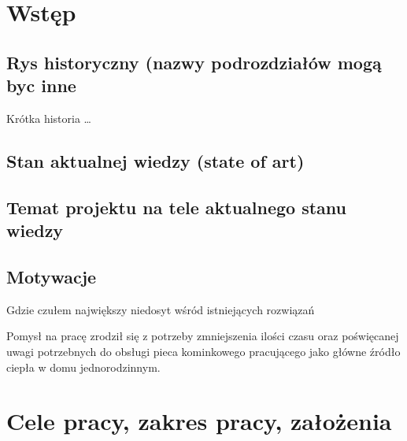 \documentclass[12pt]{report}
\begin{document}
 \begin{titlepage}
 \vspace{0.1\textheight}
 \bigskip
 \vspace{0.3\textheight}
 \par

 \vspace{0.1\textheight}
 \end{titlepage}


 \tableofcontents


 \chapter{Wstęp}
 \section{Rys historyczny (nazwy podrozdziałów mogą byc inne}
 Krótka historia \ldots
 \section{Stan aktualnej wiedzy (state of art)}
 
 \section{Temat projektu na tele aktualnego stanu wiedzy}
 
 \section{Motywacje}
 Gdzie czułem największy niedosyt wśród istniejących rozwiązań

Pomysł na pracę zrodził się z potrzeby zmniejszenia ilości czasu oraz poświęcanej uwagi potrzebnych do obsługi pieca kominkowego pracującego jako główne źródło ciepła w domu jednorodzinnym.

 \chapter{Cele pracy, zakres pracy, założenia}
\end{document}
